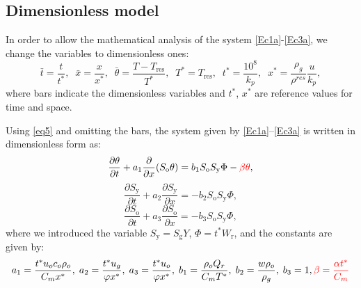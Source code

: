 \subsection{Dimensionless model}

In order to allow the mathematical analysis of the system \eqref{Ec1a}-\eqref{Ec3a}, we change the variables to dimensionless ones:
\begin{equation}\label{eq5}
	\bar{t} = \frac{t}{t^{\ast}},
	\;\;
	\bar{x} = \frac{x}{x^{\ast}},
	\;\;
	\bar{\theta} = \frac{T - T_{\text{res}}}{T^{\ast}},
	\;\;
	T^{\ast} = T_{\text{res}},
	\;\;
	t^{\ast} = \frac{10^{8}}{k_{p}},
	\;\;
	x^{\ast} = \frac{\rho_g}{\rho^{res}}\frac{u}{k_{p}},
\end{equation}
where bars indicate the dimensionless variables and $t^{\ast}$, $x^{\ast}$ are reference values for time and space.

Using \eqref{eq5} and omitting the bars, the system given by \eqref{Ec1a}--\eqref{Ec3a} is written in dimensionless form as:
\begin{equation}
	\label{eq:14}
	\displaystyle\frac{\partial \theta}{\partial t} + a_1 \displaystyle\frac{\partial }{\partial x}(S_{\text{o}} \theta) = b_1 S_{\text{o}} S_{\text{y}} \Phi - \textcolor{red}{\beta \theta},
\end{equation}
\begin{equation}
	\label{eq:15}
	\displaystyle\frac{\partial S_{\text{y}}}{\partial t} + a_2 \displaystyle\frac{\partial S_{\text{y}}}{\partial x} = - b_2 S_{\text{o}} S_{\text{y}} \Phi,
\end{equation}
\begin{equation}
	\label{eq:16}
	\displaystyle\frac{\partial S_{\text{o}}}{\partial t} + a_3 \displaystyle\frac{\partial S_{\text{o}}}{\partial  x} =
	- b_3 S_{\text{o}} S_{\text{y}} \Phi,
\end{equation}
where we introduced the variable $S_{\text{y}}=S_\text{g} Y$, $\Phi = t^{*} W_{\text{r}}$, and the constants are given by:
\begin{equation}\label{eq:17}
	a_1 = \displaystyle\frac{t^{*} u_o c_o \rho_o }{C_m x^{*}}, \;
	a_2 = \displaystyle\frac{t^{\ast} u_g}{\varphi x^{\ast}}, \;
	a_3 = \displaystyle\frac{t^{\ast} u_o}{\varphi x^{\ast}}, \;
	b_1 = \displaystyle\frac{\rho_o  Q_r }{C_m T^{*}}, \;
	b_2 = \displaystyle\frac{w \rho_o}{\rho_g},\;
	b_3 = 1, \\
	\textcolor{red}{\beta = \displaystyle\frac{\alpha t^{*}}{C_m}}
\end{equation}

